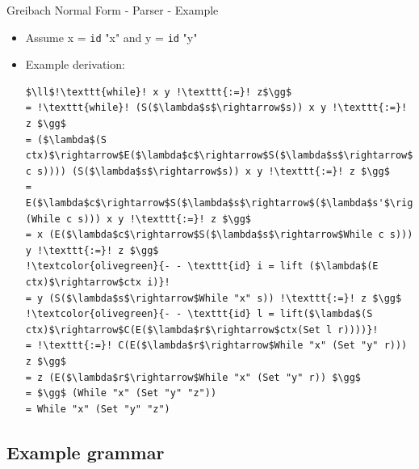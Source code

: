 \documentclass[10pt]{beamer}
\begin{document}
\begin{frame}[fragile]{Greibach Normal Form - Parser - Example}

\begin{itemize}

\item Assume x = \texttt{id} "x" and y = \texttt{id} "y"  
\item Example derivation:

\begin{lstlisting}[mathescape=true, escapechar=!]
$\ll$!\texttt{while}! x y !\texttt{:=}! z$\gg$
= !\texttt{while}! (S($\lambda$s$\rightarrow$s)) x y !\texttt{:=}! z $\gg$
= ($\lambda$(S ctx)$\rightarrow$E($\lambda$c$\rightarrow$S($\lambda$s$\rightarrow$ctx(While c s)))) (S($\lambda$s$\rightarrow$s)) x y !\texttt{:=}! z $\gg$
= E($\lambda$c$\rightarrow$S($\lambda$s$\rightarrow$($\lambda$s'$\rightarrow$s')(While c s))) x y !\texttt{:=}! z $\gg$
= x (E($\lambda$c$\rightarrow$S($\lambda$s$\rightarrow$While c s))) y !\texttt{:=}! z $\gg$
!\textcolor{olivegreen}{- - \texttt{id} i = lift ($\lambda$(E ctx)$\rightarrow$ctx i)}!
= y (S($\lambda$s$\rightarrow$While "x" s)) !\texttt{:=}! z $\gg$
!\textcolor{olivegreen}{- - \texttt{id} l = lift($\lambda$(S ctx)$\rightarrow$C(E($\lambda$r$\rightarrow$ctx(Set l r))))}!
= !\texttt{:=}! C(E($\lambda$r$\rightarrow$While "x" (Set "y" r))) z $\gg$
= z (E($\lambda$r$\rightarrow$While "x" (Set "y" r)) $\gg$
= $\gg$ (While "x" (Set "y" "z"))
= While "x" (Set "y" "z")
\end{lstlisting}
\end{itemize}

\end{frame}

\subsection{Example grammar}
\end{document}
